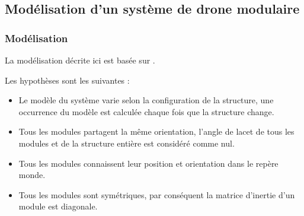 \subsection{Modélisation d'un système de drone modulaire}
\label{part:control}


\subsubsection*{Modélisation}

\noindent La modélisation décrite ici est basée sur \cite{bonnel_modeling_2024, saldana_modquad_2018}.

\noindent Les hypothèses sont les suivantes :

\begin{itemize}
    \item Le modèle du système varie selon la configuration de la structure, une occurrence du modèle est calculée chaque fois que la structure change. 
    \item Tous les modules partagent la même orientation, l'angle de lacet de tous les modules et de la structure entière est considéré comme nul.
    \item Tous les modules connaissent leur position et orientation dans le repère monde.
    \item Tous les modules sont symétriques, par conséquent la matrice d'inertie d'un module est diagonale.
\end{itemize}


